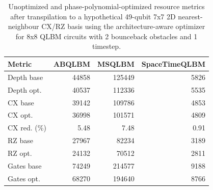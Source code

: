 \begin{table}[ht]
\centering
\begin{tabular}{lrrr}
\hline
Metric & ABQLBM & MSQLBM & SpaceTimeQLBM \\
\hline
Depth base & 44858 & 125449 & 5826 \\
Depth opt. & 40537 & 112336 & 5535 \\
CX base & 39142 & 109786 & 4853 \\
CX opt. & 36998 & 101571 & 4809 \\
CX red. (\%) & 5.48 & 7.48 & 0.91 \\
RZ base & 27967 & 82234 & 3189 \\
RZ opt. & 24132 & 70512 & 2811 \\
Gates base & 74249 & 214577 & 9188 \\
Gates opt. & 68270 & 194640 & 8766 \\
\hline
\end{tabular}
\caption{Unoptimized and phase-polynomial-optimized resource metrics after transpilation to a hypothetical 49-qubit 7x7 2D nearest-neighbour CX/RZ basis using the architecture-aware optimizer for 8x8 QLBM circuits with 2 bounceback obstacles and 1 timestep.}
\label{tab:phase-poly-optimization-comparison-8x8-obs2-t1-2d-grid}
\end{table}
